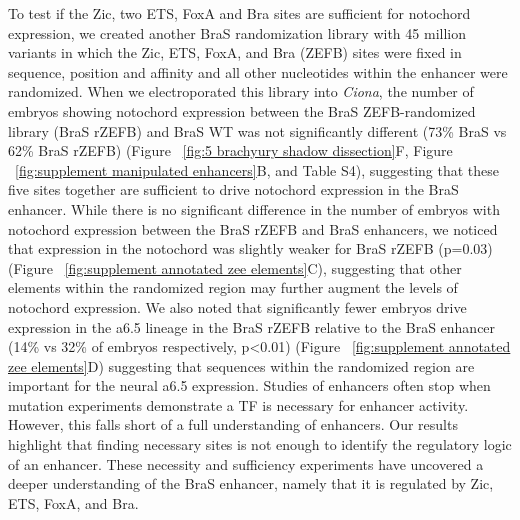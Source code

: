 To test if the Zic, two ETS, FoxA and Bra sites are sufficient for notochord expression, we created another BraS randomization library with 45 million variants in which the Zic, ETS, FoxA, and Bra (ZEFB) sites were fixed in sequence, position and affinity and all other nucleotides within the enhancer were randomized. When we electroporated this library into \textit{Ciona}, the number of embryos showing notochord expression between the BraS ZEFB-randomized library (BraS rZEFB) and BraS WT was not significantly different (73\% BraS vs 62\% BraS rZEFB) (Figure ~\ref{fig:5 brachyury shadow dissection}F, Figure ~\ref{fig:supplement manipulated enhancers}B, and Table S4), suggesting that these five sites together are sufficient to drive notochord expression in the BraS enhancer. While there is no significant difference in the number of embryos with notochord expression between the BraS rZEFB and BraS enhancers, we noticed that expression in the notochord was slightly weaker for BraS rZEFB (p=0.03) (Figure ~\ref{fig:supplement annotated zee elements}C), suggesting that other elements within the randomized region may further augment the levels of notochord expression. We also noted that significantly fewer embryos drive expression in the a6.5 lineage in the BraS rZEFB relative to the BraS enhancer (14\% vs 32\% of embryos respectively, p<0.01) (Figure ~\ref{fig:supplement annotated zee elements}D) suggesting that sequences within the randomized region are important for the neural a6.5 expression. Studies of enhancers often stop when mutation experiments demonstrate a TF is necessary for enhancer activity. However, this falls short of a full understanding of enhancers. Our results highlight that finding necessary sites is not enough to identify the regulatory logic of an enhancer. These necessity and sufficiency experiments have uncovered a deeper understanding of the BraS enhancer, namely that it is regulated by Zic, ETS, FoxA, and Bra.

